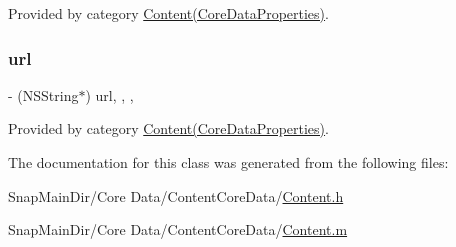 Provided by category \hyperlink{category_content_07_core_data_properties_08_a548aaf829a86fcdfdbe44b8c1964340e}{Content(\+Core\+Data\+Properties)}.

\hypertarget{interface_content_a69ab79cf4ff1fc815c93956fc9108dfd}{}\label{interface_content_a69ab79cf4ff1fc815c93956fc9108dfd} 
\subsubsection{\texorpdfstring{url}{url}}
{\footnotesize\ttfamily -\/ (N\+S\+String$\ast$) url\hspace{0.3cm}{\ttfamily [read]}, {\ttfamily [write]}, {\ttfamily [nonatomic]}, {\ttfamily [retain]}}



Provided by category \hyperlink{category_content_07_core_data_properties_08_a69ab79cf4ff1fc815c93956fc9108dfd}{Content(\+Core\+Data\+Properties)}.



The documentation for this class was generated from the following files\+:\begin{DoxyCompactItemize}
\item 
Snap\+Main\+Dir/\+Core Data/\+Content\+Core\+Data/\hyperlink{_content_8h}{Content.\+h}\item 
Snap\+Main\+Dir/\+Core Data/\+Content\+Core\+Data/\hyperlink{_content_8m}{Content.\+m}\end{DoxyCompactItemize}
